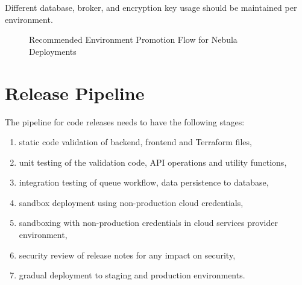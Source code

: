 Different database, broker, and encryption key usage should be maintained per environment.

\begin{figure}[h]
\centering
{}
\caption{Recommended Environment Promotion Flow for Nebula Deployments}
\label{fig:environment_promotion}
\end{figure}

\section{Release Pipeline}
The pipeline for code releases needs to have the following stages:

\begin{enumerate}
    \item static code validation of backend, frontend and Terraform files,
    \item unit testing of the validation code, API operations and utility functions,
    \item integration testing of queue workflow, data persistence to database,
    \item sandbox deployment using non-production cloud credentials,
    \item sandboxing with non-production credentials in cloud services provider environment,
    \item security review of release notes for any impact on security,
    \item gradual deployment to staging and production environments.
\end{enumerate}

